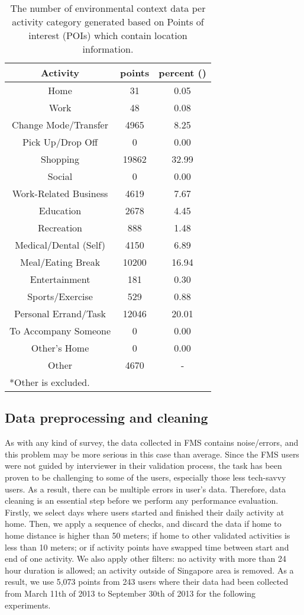\documentclass{sig-alternate}
\begin{document}
\begin{table}[htb]
\scriptsize
\caption{The number of environmental context data per activity category generated based on Points of interest (POIs) which contain location information.  } \label{table:poi}
\centering
\begin{tabular}{c c c}
\toprule
Activity & points & percent () \\
\midrule
Home & 31 & 0.05 \\
Work & 48 & 0.08 \\
Change Mode/Transfer & 4965 & 8.25 \\
Pick Up/Drop Off & 0 & 0.00 \\
Shopping & 19862 & 32.99 \\
Social & 0 & 0.00 \\
Work-Related Business & 4619 & 7.67 \\
Education & 2678 & 4.45 \\
Recreation & 888 & 1.48 \\
Medical/Dental (Self) & 4150 & 6.89 \\
Meal/Eating Break & 10200 & 16.94 \\
Entertainment & 181 & 0.30 \\
Sports/Exercise & 529 & 0.88 \\
Personal Errand/Task & 12046 & 20.01 \\
To Accompany Someone & 0 & 0.00 \\
Other's Home & 0 & 0.00 \\
Other &	4670 & -\\
\bottomrule
\multicolumn{2}{l}{*Other is excluded.   }\\

\end{tabular}
\end{table}


\subsection{Data preprocessing and cleaning}
As with any kind of survey, the data collected in FMS contains noise/errors, and this problem may be more serious in this case than average. Since the FMS users were not guided by interviewer in their validation process, the task has been proven to be challenging to some of the users, especially those less tech-savvy users. As a result, there can be multiple errors in user's data. Therefore, data cleaning is an essential step before we perform any performance evaluation. Firstly, we select days where users started and finished their daily activity at home. Then, we apply a sequence of checks, and discard the data if home to home distance is higher than 50 meters; if home to other validated activities is less than 10 meters; or if activity points have swapped time between start and end of one activity. We also apply other filters: no activity with more than 24 hour duration is allowed; an activity outside of Singapore area is removed. As a result, we use 5,073 points from 243 users where their data had been collected from March 11th of 2013 to September 30th of 2013  for the following experiments.
\end{document}
